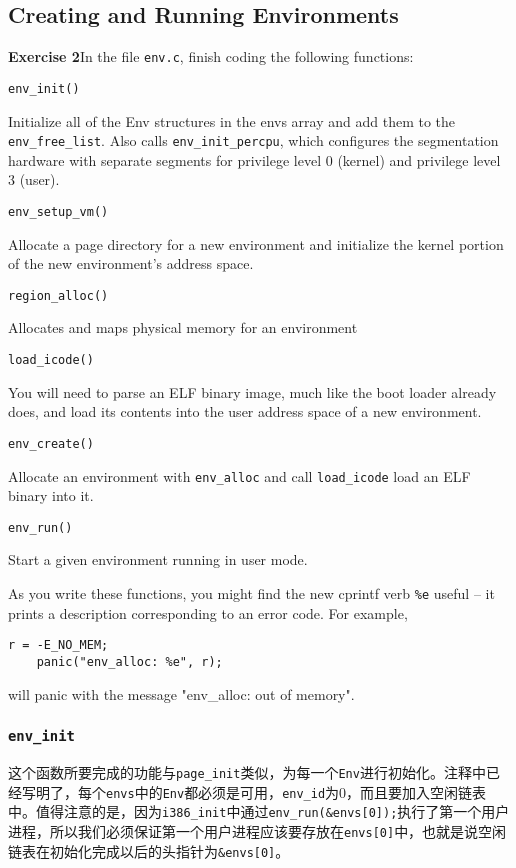 \documentclass[11pt]{article}
\begin{document}
\subsection{Creating and Running Environments}
\begin{framed}
\noindent\textbf{Exercise 2}In the file \lstinline|env.c|, finish coding the following functions:

\noindent\lstinline|env_init()|

    Initialize all of the Env structures in the envs array and add them to the \lstinline|env_free_list|. Also calls \lstinline|env_init_percpu|, which configures the segmentation hardware with separate segments for privilege level 0 (kernel) and privilege level 3 (user).

\noindent\lstinline|env_setup_vm()|

    Allocate a page directory for a new environment and initialize the kernel portion of the new environment's address space.

\noindent\lstinline|region_alloc()|

    Allocates and maps physical memory for an environment

\noindent\lstinline|load_icode()|

    You will need to parse an ELF binary image, much like the boot loader already does, and load its contents into the user address space of a new environment.

\noindent\lstinline|env_create()|

    Allocate an environment with \lstinline|env_alloc| and call \lstinline|load_icode| load an ELF binary into it.
    
\noindent\lstinline|env_run()|

    Start a given environment running in user mode.

As you write these functions, you might find the new cprintf verb \lstinline|%e| useful -- it prints a description corresponding to an error code. For example,

\begin{lstlisting}[aboveskip=-1.5em,frame=none]
	r = -E_NO_MEM;
	panic("env_alloc: %e", r);
\end{lstlisting}

will panic with the message "env\_alloc: out of memory". 
\end{framed}

\subsubsection{\lstinline|env_init|}
这个函数所要完成的功能与\lstinline|page_init|类似，为每一个\lstinline|Env|进行初始化。注释中已经写明了，每个\lstinline|envs|中的\lstinline|Env|都必须是可用，\lstinline|env_id|为0，而且要加入空闲链表中。值得注意的是，因为\lstinline|i386_init|中通过\lstinline|env_run(&envs[0]);|执行了第一个用户进程，所以我们必须保证第一个用户进程应该要存放在\lstinline|envs[0]|中，也就是说空闲链表在初始化完成以后的头指针为\lstinline|&envs[0]|。
\end{document}
